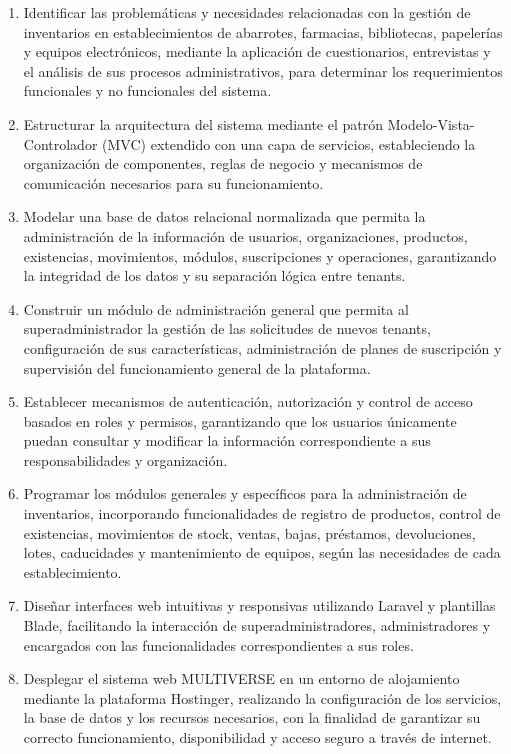 \begin{enumerate}
    \item Identificar las problemáticas y necesidades relacionadas con la gestión de inventarios en establecimientos de abarrotes, farmacias, bibliotecas, papelerías y equipos electrónicos, mediante la aplicación de cuestionarios, entrevistas y el análisis de sus procesos administrativos, para determinar los requerimientos funcionales y no funcionales del sistema.
    \item Estructurar la arquitectura del sistema mediante el patrón Modelo-Vista-Controlador (MVC) extendido con una capa de servicios, estableciendo la organización de componentes, reglas de negocio y mecanismos de comunicación necesarios para su funcionamiento.
    \item Modelar una base de datos relacional normalizada que permita la administración de la información de usuarios, organizaciones, productos, existencias, movimientos, módulos, suscripciones y operaciones, garantizando la integridad de los datos y su separación lógica entre tenants.
    \item Construir un módulo de administración general que permita al superadministrador la gestión de las solicitudes de nuevos tenants, configuración de sus características, administración de planes de suscripción y supervisión del funcionamiento general de la plataforma.
    \item Establecer mecanismos de autenticación, autorización y control de acceso basados en roles y permisos, garantizando que los usuarios únicamente puedan consultar y modificar la información correspondiente a sus responsabilidades y organización.
    \item Programar los módulos generales y específicos para la administración de inventarios, incorporando funcionalidades de registro de productos, control de existencias, movimientos de stock, ventas, bajas, préstamos, devoluciones, lotes, caducidades y mantenimiento de equipos, según las necesidades de cada establecimiento.
    \item Diseñar interfaces web intuitivas y responsivas utilizando Laravel y plantillas Blade, facilitando la interacción de superadministradores, administradores y encargados con las funcionalidades correspondientes a sus roles.
    \item Desplegar el sistema web MULTIVERSE en un entorno de alojamiento mediante la plataforma Hostinger, realizando la configuración de los servicios, la base de datos y los recursos necesarios, con la finalidad de garantizar su correcto funcionamiento, disponibilidad y acceso seguro a través de internet.
\end{enumerate}


